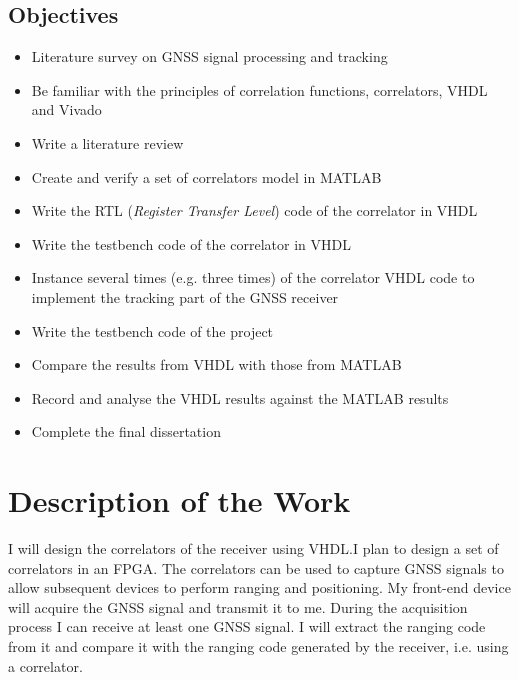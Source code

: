 \subsection{Objectives}
\begin{itemize}
    \item Literature survey on GNSS signal processing and tracking
    \item Be familiar with the principles of correlation functions, correlators, VHDL and Vivado
    \item Write a literature review
    \item Create and verify a set of correlators model in MATLAB
    \item Write the RTL (\textit{Register Transfer Level}) code of the correlator in VHDL
    \item Write the testbench code of the correlator in VHDL
    \item Instance several times (e.g. three times) of the correlator VHDL code to implement the tracking part of the GNSS receiver
    \item Write the testbench code of the project
    \item Compare the results from VHDL with those from MATLAB
    \item Record and analyse the VHDL results against the MATLAB results
    \item Complete the final dissertation
\end{itemize}

\section{Description of the Work}
I will design the correlators of the receiver using VHDL.I plan to design a set of correlators in an FPGA. The correlators can be used to capture GNSS signals to allow subsequent devices to perform ranging and positioning. My front-end device will acquire the GNSS signal and transmit it to me. During the acquisition process I can receive at least one GNSS signal. I will extract the ranging code from it and compare it with the ranging code generated by the receiver, i.e. using a correlator.




